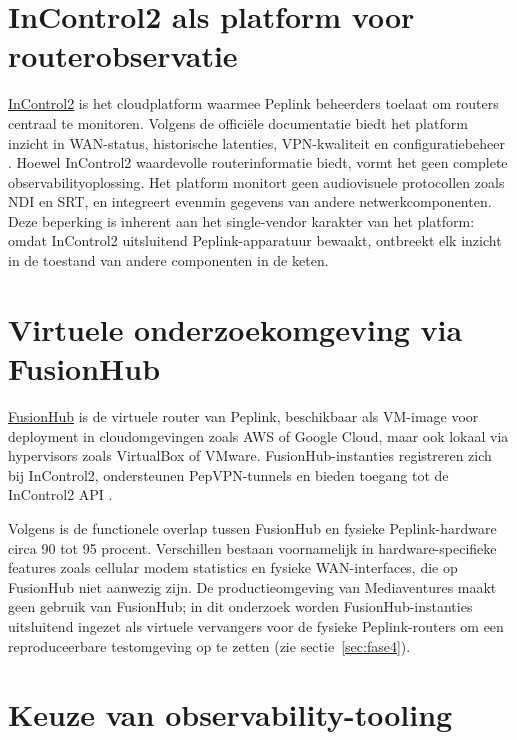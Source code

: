 \section{InControl2 als platform voor routerobservatie}
\label{sec:incontrol2}

\href{https://incontrol2.peplink.com/}{InControl2} is het cloudplatform waarmee Peplink beheerders toelaat om routers centraal te monitoren. Volgens de officiële documentatie biedt het platform inzicht in WAN-status, historische latenties, VPN-kwaliteit en configuratiebeheer \autocite{Peplink2023}. Hoewel InControl2 waardevolle routerinformatie biedt, vormt het geen complete observabilityoplossing. Het platform monitort geen audiovisuele protocollen zoals NDI en SRT, en integreert evenmin gegevens van andere netwerkcomponenten. Deze beperking is inherent aan het single-vendor karakter van het platform: omdat InControl2 uitsluitend Peplink-apparatuur bewaakt, ontbreekt elk inzicht in de toestand van andere componenten in de keten.

\section{Virtuele onderzoekomgeving via FusionHub}
\label{sec:fusionhub}

\href{https://www.peplink.com/products/fusionhub/}{FusionHub} is de virtuele router van Peplink, beschikbaar als VM-image voor deployment in cloudomgevingen zoals AWS of Google Cloud, maar ook lokaal via hypervisors zoals VirtualBox of VMware. FusionHub-instanties registreren zich bij InControl2, ondersteunen PepVPN-tunnels en bieden toegang tot de InControl2 API \autocite{Peplink2023}.

Volgens \textcite{VanRenterghem2025} is de functionele overlap tussen FusionHub en fysieke Peplink-hardware circa 90 tot 95 procent. Verschillen bestaan voornamelijk in hardware-specifieke features zoals cellular modem statistics en fysieke WAN-interfaces, die op FusionHub niet aanwezig zijn. De productieomgeving van Mediaventures maakt geen gebruik van FusionHub; in dit onderzoek worden FusionHub-instanties uitsluitend ingezet als virtuele vervangers voor de fysieke Peplink-routers om een reproduceerbare testomgeving op te zetten (zie sectie~\ref{sec:fase4}).

\section{Keuze van observability-tooling}
\label{sec:tool-keuze}

